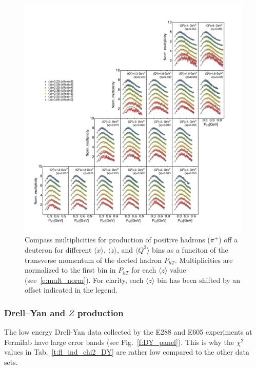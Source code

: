 \documentclass[aps,preprintnumbers,showpacs,nofootinbib,superscriptaddress,floatfix]{revtex4}
\begin{document}
\begin{figure}[h!]
\begin{center}
\includegraphics[width=\textwidth]{plots/COMPASS_SCIplot_flINDEP_Piplus.pdf}
\end{center}
\caption{Compass multiplicities for production of positive hadrons ($\pi^+$) off a deuteron for different $\langle x \rangle$, $\langle z \rangle$, and $\langle Q^2 \rangle$ bins as a funciton of the transverse momentum of the dected hadron $P_{hT}$. Multiplicities are normalized to the first bin in  $P_{hT}$ for each $\langle z \rangle$ value (see~\eqref{e:mult_norm}). For clarity, each $\langle z \rangle$  bin has been shifted by an offset indicated in the legend.} 
\label{f:C_pip}
\end{figure}





\subsubsection*{Drell--Yan and $Z$ production}
\label{sss:DYZ_agreement}


The low energy Drell-Yan data collected by the E288 and E605 experiments at Fermilab have large error bands (see Fig.~\ref{f:DY_panel}). This is why the $\chi^2$ values in Tab.~\ref{t:fl_ind_chi2_DY} are rather low compared to the other data sets. 
\end{document}
